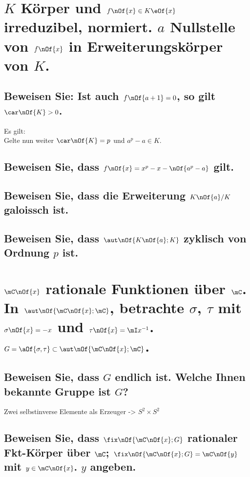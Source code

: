 \documentclass[11pt,a4paper]{scrartcl}
\begin{document}
\section{$K$ Körper und $f\nOf{x}\in K \eOf{x}$ irreduzibel, normiert. $a$ Nullstelle von $f\nOf{x}$ in Erweiterungskörper von $K$.}

\subsection{Beweisen Sie: Ist auch $f\nOf{a + 1} = 0$, so gilt $\car\nOf{K} > 0$.}
Es gilt:
\\ Gelte nun weiter $\car\nOf{K} = p$ und $a^p - a \in K$.
\subsection{Beweisen Sie, dass $f\nOf{x} = x^p - x - \nOf{a^p - a}$ gilt.}

\subsection{Beweisen Sie, dass die Erweiterung $K\nOf{a}/K$ galoissch ist.}

\subsection{Beweisen Sie, dass $\aut\nOf{K\nOf{a};K}$ zyklisch von Ordnung $p$ ist.}

\section{$\mC\nOf{x}$ rationale Funktionen über $\mC$. In $\aut\nOf{\mC\nOf{x};\mC}$, betrachte $\sigma$, $\tau$ mit $\sigma\nOf{x} = - x$ und $\tau\nOf{x} = \mI x^{-1}$. $G = \aOf{\sigma,\tau}\subset \aut\nOf{\mC\nOf{x};\mC}$.}

\subsection{Beweisen Sie, dass $G$ endlich ist. Welche Ihnen bekannte Gruppe ist $G$?}
Zwei selbstinverse Elemente als Erzeuger -> $S^2 \times S^2$

\subsection{Beweisen Sie, dass $\fix\nOf{\mC\nOf{x};G}$ rationaler Fkt-Körper über $\mC$; $\fix\nOf{\mC\nOf{x};G} = \mC\nOf{y}$ mit $y\in\mC\nOf{x}$. $y$ angeben.}	
\end{document}
